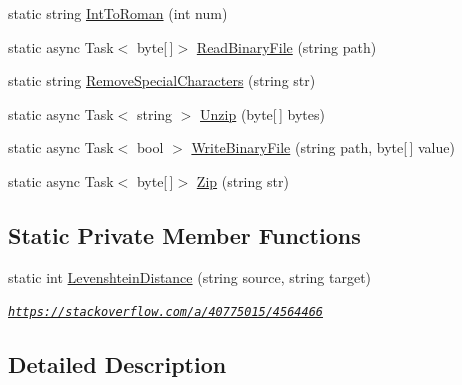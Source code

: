 \begin{DoxyCompactItemize}
\item 
static string \mbox{\hyperlink{class_little_weeb_library_1_1_static_classes_1_1_utility_methods_ab54bc5e0856652f4554fda497af655b8}{Int\+To\+Roman}} (int num)
\item 
static async Task$<$ byte\mbox{[}$\,$\mbox{]}$>$ \mbox{\hyperlink{class_little_weeb_library_1_1_static_classes_1_1_utility_methods_a7b5de7a3ecc749b655fc3ed2af55360b}{Read\+Binary\+File}} (string path)
\item 
static string \mbox{\hyperlink{class_little_weeb_library_1_1_static_classes_1_1_utility_methods_aa04235b1cf84b6741c496d8ecaea0eeb}{Remove\+Special\+Characters}} (string str)
\item 
static async Task$<$ string $>$ \mbox{\hyperlink{class_little_weeb_library_1_1_static_classes_1_1_utility_methods_a0a86ee01a3bf201bd9cc9b2552e54976}{Unzip}} (byte\mbox{[}$\,$\mbox{]} bytes)
\item 
static async Task$<$ bool $>$ \mbox{\hyperlink{class_little_weeb_library_1_1_static_classes_1_1_utility_methods_a6542a3a6ea0aed6b4d78bb44a4a7d9d7}{Write\+Binary\+File}} (string path, byte\mbox{[}$\,$\mbox{]} value)
\item 
static async Task$<$ byte\mbox{[}$\,$\mbox{]}$>$ \mbox{\hyperlink{class_little_weeb_library_1_1_static_classes_1_1_utility_methods_a16933213071d531063b29979e7b55fe8}{Zip}} (string str)
\end{DoxyCompactItemize}
\subsection*{Static Private Member Functions}
\begin{DoxyCompactItemize}
\item 
static int \mbox{\hyperlink{class_little_weeb_library_1_1_static_classes_1_1_utility_methods_aaa6b7e7b9ba5429a7c91ef95bb408653}{Levenshtein\+Distance}} (string source, string target)
\begin{DoxyCompactList}\small\item\em \href{https://stackoverflow.com/a/40775015/4564466}{\tt https\+://stackoverflow.\+com/a/40775015/4564466} \end{DoxyCompactList}\end{DoxyCompactItemize}


\subsection{Detailed Description}



